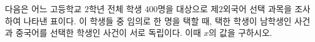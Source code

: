 다음은 어느 고등학교 $2$학년 전체 학생 400명을 대상으로 제$2$외국어 선택 과목을 조사하여 나타낸 표이다. 이 학생들 중 임의로 한 명을 택할 때, 택한 학생이 남학생인 사건과 중국어를 선택한 학생인 사건이 서로 독립이다. 이때 $x$의 값을 구하시오.
\par\smallskip\begin{center}\resizebox{\ifdim\width>\linewidth\linewidth\else\width\fi}{!}{}\end{center}
